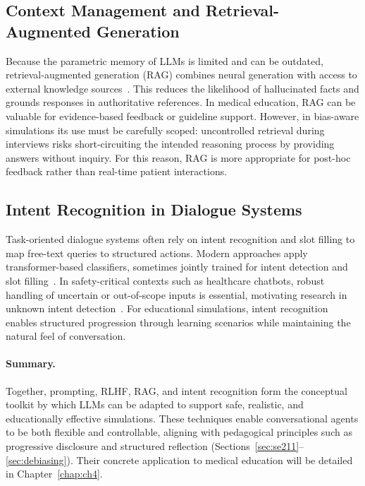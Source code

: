\subsection{Context Management and Retrieval-Augmented Generation}
Because the parametric memory of LLMs is limited and can be outdated,
retrieval-augmented generation (RAG) combines neural generation with access
to external knowledge sources~\parencite{lewis_rag_2020}. This reduces the
likelihood of hallucinated facts and grounds responses in authoritative
references. In medical education, RAG can be valuable for evidence-based
feedback or guideline support. However, in bias-aware simulations its use must
be carefully scoped: uncontrolled retrieval during interviews risks
short-circuiting the intended reasoning process by providing answers without
inquiry. For this reason, RAG is more appropriate for post-hoc feedback rather
than real-time patient interactions.


\subsection{Intent Recognition in Dialogue Systems}
Task-oriented dialogue systems often rely on intent recognition and slot
filling to map free-text queries to structured actions. Modern approaches
apply transformer-based classifiers, sometimes jointly trained for intent
detection and slot filling~\parencite{louvan_intent_slot_survey_2020,zhang_joint_2021}.
In safety-critical contexts such as healthcare chatbots, robust handling of
uncertain or out-of-scope inputs is essential, motivating research in unknown
intent detection~\parencite{liang_unknown_intent_2024}. For educational
simulations, intent recognition enables structured progression through
learning scenarios while maintaining the natural feel of conversation.

\paragraph{Summary.}
Together, prompting, RLHF, RAG, and intent recognition form the conceptual
toolkit by which LLMs can be adapted to support safe, realistic, and
educationally effective simulations. These techniques enable conversational
agents to be both flexible and controllable, aligning with pedagogical
principles such as progressive disclosure and structured reflection
(Sections~\ref{sec:se211}--\ref{sec:debiasing}). Their concrete application
to medical education will be detailed in Chapter~\ref{chap:ch4}.




